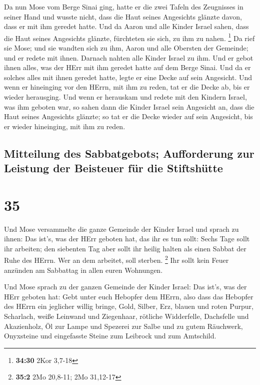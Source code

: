  Da nun Mose vom Berge Sinai ging, hatte er die zwei
Tafeln des Zeugnisses in seiner Hand und wusste nicht, dass die Haut
seines Angesichts glänzte davon, dass er mit ihm geredet hatte.
 Und da Aaron und alle Kinder Israel sahen, dass die Haut
seines Angesichts glänzte, fürchteten sie sich, zu ihm zu nahen.
\footnote{\textbf{34:30} 2Kor 3,7-18}  Da rief sie Mose;
und sie wandten sich zu ihm, Aaron und alle Obersten der Gemeinde; und
er redete mit ihnen.  Darnach nahten alle Kinder Israel
zu ihm. Und er gebot ihnen alles, was der HErr mit ihm geredet hatte auf
dem Berge Sinai.  Und da er solches alles mit ihnen
geredet hatte, legte er eine Decke auf sein Angesicht. 
Und wenn er hineinging vor den HErrn, mit ihm zu reden, tat er die Decke
ab, bis er wieder herausging. Und wenn er herauskam und redete mit den
Kindern Israel, was ihm geboten war,  so sahen dann die
Kinder Israel sein Angesicht an, dass die Haut seines Angesichts
glänzte; so tat er die Decke wieder auf sein Angesicht, bis er wieder
hineinging, mit ihm zu reden.

\hypertarget{mitteilung-des-sabbatgebots-aufforderung-zur-leistung-der-beisteuer-fuxfcr-die-stiftshuxfctte}{%
\subsection{Mitteilung des Sabbatgebots; Aufforderung zur Leistung der
Beisteuer für die
Stiftshütte}\label{mitteilung-des-sabbatgebots-aufforderung-zur-leistung-der-beisteuer-fuxfcr-die-stiftshuxfctte}}

\hypertarget{section-34}{%
\section{35}\label{section-34}}

 Und Mose versammelte die ganze Gemeinde der Kinder Israel
und sprach zu ihnen: Das ist's, was der HErr geboten hat, das ihr es tun
sollt:  Sechs Tage sollt ihr arbeiten; den siebenten Tag
aber sollt ihr heilig halten als einen Sabbat der Ruhe des HErrn. Wer an
dem arbeitet, soll sterben. \footnote{\textbf{35:2} 2Mo 20,8-11; 2Mo
  31,12-17}  Ihr sollt kein Feuer anzünden am Sabbattag in
allen euren Wohnungen.

 Und Mose sprach zu der ganzen Gemeinde der Kinder Israel:
Das ist's, was der HErr geboten hat:  Gebt unter euch
Hebopfer dem HErrn, also dass das Hebopfer des HErrn ein jeglicher
willig bringe, Gold, Silber, Erz,  blauen und roten
Purpur, Scharlach, weiße Leinwand und Ziegenhaar, 
rötliche Widderfelle, Dachsfelle und Akazienholz,  Öl zur
Lampe und Spezerei zur Salbe und zu gutem Räuchwerk, 
Onyxsteine und eingefasste Steine zum Leibrock und zum Amtschild.

